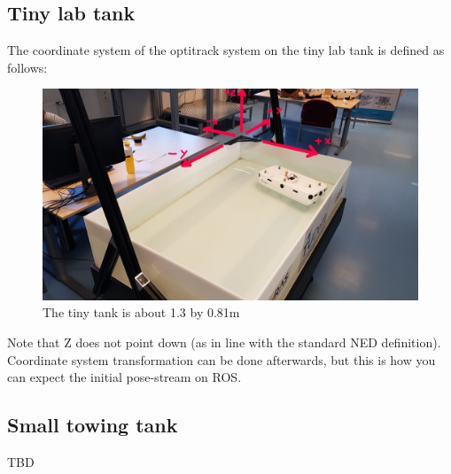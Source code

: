 \documentclass[]{article}
\begin{document}
\subsection{Tiny lab tank}
The coordinate system of the optitrack system on the tiny lab tank is defined as follows:

\begin{figure}[H]
	\centering
	\includegraphics[width=0.8\paperwidth]{tinyTank1_labeled.jpg}
	\caption{The tiny tank is about 1.3 by 0.81m}
\end{figure}
Note that Z does not point down (as in line with the standard NED definition). Coordinate system transformation can be done afterwards, but this is how you can expect the initial pose-stream on ROS.

\subsection{Small towing tank}
TBD
\end{document}
